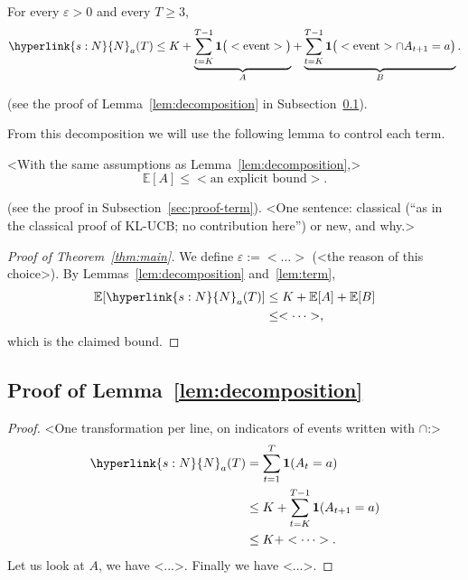 \documentclass[11pt]{article}
\newcommand{\E}{\mathbb{E}}
\newcommand{\sy}[2]{\hyperlink{#1}{#2}}
\newcommand{\N}{\sy{s:N}{N}}
\begin{document}
\begin{lemma}[Decomposition]\label{lem:decomposition}
For every $\varepsilon>0$ and every $T\ge3$,
\begin{equation*}
  \N_a(T) \le K + \underbrace{\sum_{t=K}^{T-1}\mathbf 1\big(<\text{event}>\big)}_{A}
              + \underbrace{\sum_{t=K}^{T-1}\mathbf 1\big(<\text{event}>\cap A_{t+1}=a\big)}_{B}.
\end{equation*}
\end{lemma}
(see the proof of Lemma~\ref{lem:decomposition} in Subsection~\ref{sec:proof-decomposition}).

From this decomposition we will use the following lemma to control each term.

\begin{lemma}\label{lem:term}
<With the same assumptions as Lemma~\ref{lem:decomposition},>
\begin{equation*}
  \E[A] \le <\text{an explicit bound}>.
\end{equation*}
\end{lemma}
(see the proof in Subsection~\ref{sec:proof-term}). <One sentence: classical (``as in the classical
proof of KL-UCB; no contribution here'') or new, and why.>

\begin{proof}[Proof of Theorem~\ref{thm:main}]
We define $\varepsilon := <\dots>$ (<the reason of this choice>). By Lemmas~\ref{lem:decomposition}
and~\ref{lem:term},
\begin{align*}
  \E[\N_a(T)] &\le K + \E[A] + \E[B] \\
              &\le <\dots>,
\end{align*}
which is the claimed bound.
\end{proof}

\subsection{Proof of Lemma~\ref{lem:decomposition}}\label{sec:proof-decomposition}

\begin{proof}
<One transformation per line, on indicators of events written with $\cap$:>
\begin{align*}
  \N_a(T) &= \sum_{t=1}^{T}\mathbf 1(A_t=a) \\
          &\le K + \sum_{t=K}^{T-1}\mathbf 1(A_{t+1}=a) \\
          &\le K + <\dots>.
\end{align*}
Let us look at $A$, we have <...>. Finally we have <...>.
\end{proof}
\end{document}
